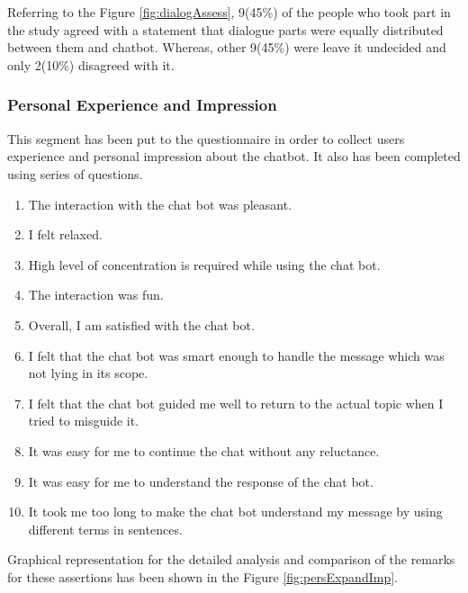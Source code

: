 \\~\\
Referring to the Figure \ref{fig:dialogAssess}, 9(45\%) of the people who took part in the study agreed with a statement that dialogue parts were equally distributed between them and chatbot. Whereas, other 9(45\%) were leave it undecided and only 2(10\%) disagreed with it.


\subsubsection*{Personal Experience and Impression}
This segment has been put to the questionnaire in order to collect users experience and personal impression about the chatbot. It also has been completed using series of questions. 
\begin{enumerate}
    \item The interaction with the chat bot was pleasant.
    \item I felt relaxed.
    \item High level of concentration is required while using the chat bot.
    \item The interaction was fun.
    \item Overall, I am satisfied with the chat bot.
    \item I felt that the chat bot was smart enough to handle the message which was not lying in its scope.
    \item I felt that the chat bot guided me well to return to the actual topic when I tried to misguide it.
    \item It was easy for me to continue the chat without any reluctance.
    \item It was easy for me to understand the response of the chat bot.
    \item It took me too long to make the chat bot understand my message by using different terms in sentences.
\end{enumerate}
Graphical representation for the detailed analysis and comparison of the remarks for these assertions has been shown in the Figure \ref{fig:persExpandImp}.

